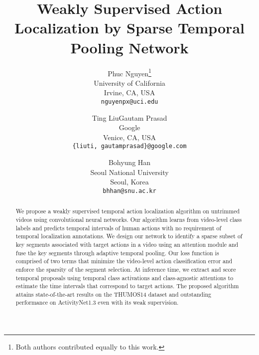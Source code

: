 \documentclass[10pt,twocolumn,letterpaper]{article}
\begin{document}
\title{Weakly Supervised Action Localization by Sparse Temporal Pooling Network}

\author{Phuc Nguyen\thanks{Both authors contributed equally to this work.}\\
University of California\\
Irvine, CA, USA \\
{\tt\small nguyenpx@uci.edu}
\and
Ting Liu\footnotemark[1]\qquad Gautam Prasad\\
Google\\
Venice, CA, USA \\
{\tt\small \{liuti, gautamprasad\}@google.com}
\and
Bohyung Han\\
Seoul National University\\
Seoul, Korea\\
{\tt\small bhhan@snu.ac.kr}
}

\maketitle
\thispagestyle{empty}

\begin{abstract}
We propose a weakly supervised temporal action localization algorithm on untrimmed videos using convolutional neural networks.
Our algorithm learns from video-level class labels and predicts temporal intervals of human actions with no requirement of temporal localization annotations.
We design our network to identify a sparse subset of key segments associated with target actions in a video using an attention module and fuse the key segments through adaptive temporal pooling.
Our loss function is comprised of two terms that minimize the video-level action classification error and enforce the sparsity of the segment selection.
At inference time, we extract and score temporal proposals using temporal class activations and class-agnostic attentions to estimate the time intervals that correspond to target actions.
The proposed algorithm attains state-of-the-art results on the THUMOS14 dataset and outstanding performance on ActivityNet1.3 even with its weak supervision.
\end{abstract}
\end{document}
